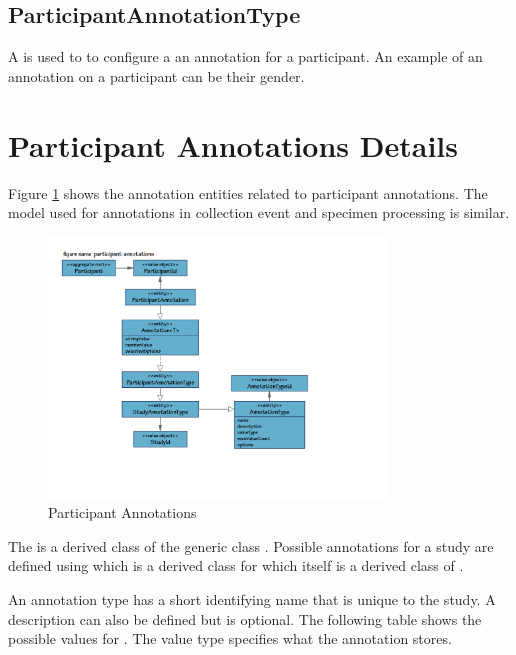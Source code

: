 \subsection*{ParticipantAnnotationType}
A  is used to to configure a an annotation for a
participant. An example of an annotation on a participant can be their gender.

\section{Participant Annotations Details}
Figure \ref{fig-participant-annotations} shows the annotation entities related
to participant annotations. The model used for annotations in collection event
and specimen processing is similar.

\begin{figure}[H]
  \centering
  \includegraphics[trim={10mm 32mm 62mm 18mm}, clip,
    width=0.8\textwidth]{images/participant-annotations}
  \caption{Participant Annotations}
  \label{fig-participant-annotations}
\end{figure}

The  is a derived class of the generic class
. Possible annotations for a study are defined using
 which is a derived class for
 which itself is a derived class of
.

An annotation type has a short identifying name that is unique to the study. A
description can also be defined but is optional. The following table shows the
possible values for . The value type specifies what the
annotation stores.


